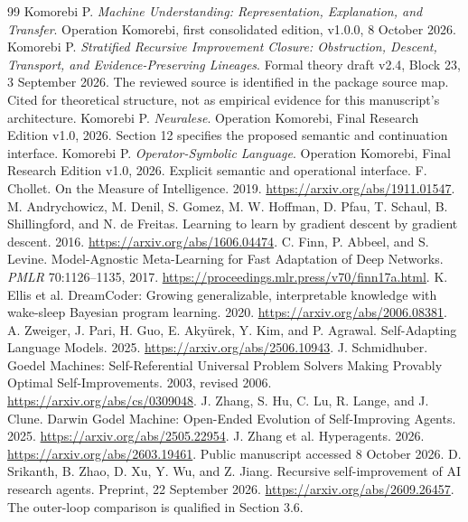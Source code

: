 \documentclass[11pt,letterpaper]{article}
\theoremstyle{plain}
\theoremstyle{definition}
\begin{document}
\clearpage{}
\begin{thebibliography}{99}\fontsize{9.5}{11.2}\selectfont\setlength{\itemsep}{3pt}\setlength{\parskip}{0pt}
 Komorebi P. \emph{Machine Understanding: Representation, Explanation, and Transfer}. Operation Komorebi, first consolidated edition, v1.0.0, 8 October 2026.
 Komorebi P. \emph{Stratified Recursive Improvement Closure: Obstruction, Descent, Transport, and Evidence-Preserving Lineages}. Formal theory draft v2.4, Block 23, 3 September 2026. The reviewed source is identified in the package source map. Cited for theoretical structure, not as empirical evidence for this manuscript's architecture.
 Komorebi P. \emph{Neuralese}. Operation Komorebi, Final Research Edition v1.0, 2026. Section 12 specifies the proposed semantic and continuation interface.
 Komorebi P. \emph{Operator-Symbolic Language}. Operation Komorebi, Final Research Edition v1.0, 2026. Explicit semantic and operational interface.
 F. Chollet. On the Measure of Intelligence. 2019. \url{https://arxiv.org/abs/1911.01547}.
 M. Andrychowicz, M. Denil, S. Gomez, M. W. Hoffman, D. Pfau, T. Schaul, B. Shillingford, and N. de Freitas. Learning to learn by gradient descent by gradient descent. 2016. \url{https://arxiv.org/abs/1606.04474}.
 C. Finn, P. Abbeel, and S. Levine. Model-Agnostic Meta-Learning for Fast Adaptation of Deep Networks. \emph{PMLR} 70:1126--1135, 2017. \url{https://proceedings.mlr.press/v70/finn17a.html}.
 K. Ellis et al. DreamCoder: Growing generalizable, interpretable knowledge with wake-sleep Bayesian program learning. 2020. \url{https://arxiv.org/abs/2006.08381}.
 A. Zweiger, J. Pari, H. Guo, E. Aky\"urek, Y. Kim, and P. Agrawal. Self-Adapting Language Models. 2025. \url{https://arxiv.org/abs/2506.10943}.
 J. Schmidhuber. Goedel Machines: Self-Referential Universal Problem Solvers Making Provably Optimal Self-Improvements. 2003, revised 2006. \url{https://arxiv.org/abs/cs/0309048}.
 J. Zhang, S. Hu, C. Lu, R. Lange, and J. Clune. Darwin Godel Machine: Open-Ended Evolution of Self-Improving Agents. 2025. \url{https://arxiv.org/abs/2505.22954}.
 J. Zhang et al. Hyperagents. 2026. \url{https://arxiv.org/abs/2603.19461}. Public manuscript accessed 8 October 2026.
 D. Srikanth, B. Zhao, D. Xu, Y. Wu, and Z. Jiang. Recursive self-improvement of AI research agents. Preprint, 22 September 2026. \url{https://arxiv.org/abs/2609.26457}. The outer-loop comparison is qualified in Section 3.6.

\end{thebibliography}
\end{document}
